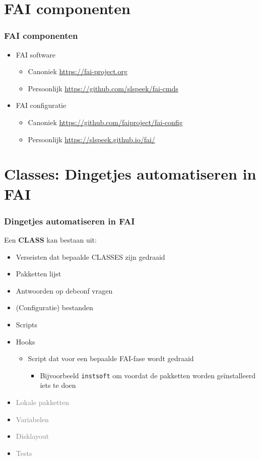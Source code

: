 \documentclass{beamer}
\newcommand{\light}[1]{\textcolor{gray}{#1}}
\begin{document}
\section{FAI componenten}
\begin{frame}
\frametitle{FAI componenten}
\begin{itemize}
  \item FAI software
  \begin{itemize}
    \item Canoniek \url{https://fai-project.org}
    \item Persoonlijk \url{https://github.com/slspeek/fai-cmds}
  \end{itemize}
  \item FAI configuratie
  \begin{itemize}
    \item Canoniek \url{https://github.com/faiproject/fai-config}
    \item Persoonlijk \url{https://slspeek.github.io/fai/}
  \end{itemize}
\end{itemize}
\end{frame}

\section{Classes: Dingetjes automatiseren in FAI}
\begin{frame}
\frametitle{Dingetjes automatiseren in FAI}
Een \textbf{CLASS} kan bestaan uit:
\begin{itemize} 
  \item Verseisten dat bepaalde CLASSES zijn gedraaid
  \item Pakketten lijst
  \item Antwoorden op debconf vragen
  \item (Configuratie) bestanden
  \item Scripts
  \item<2-> Hooks
  \begin{itemize}
    \item Script dat voor een bepaalde FAI-fase wordt gedraaid
    \begin{itemize}
      \item Bijvoorbeeld \texttt{instsoft} om voordat de pakketten worden geïnstalleerd iets te doen
      \end{itemize}
  \end{itemize}
  \item<3-> \light{Lokale pakketten}
  \item<3-> \light{Variabelen}
  \item<3-> \light{Disklayout}
  \item<3-> \light{Tests}
\end{itemize}
\end{frame}
\end{document}
